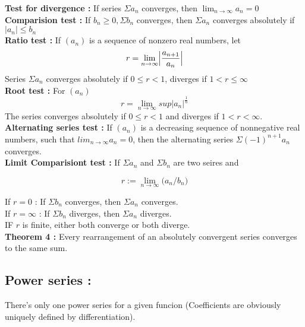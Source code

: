 \documentclass{report}
\begin{document}
\noindent \textbf{Test for divergence :}  If series $\Sigma a_n$ converges, then $\lim_{n\to\infty} a_n = 0$ \\

\noindent \textbf{Comparision test :} If $b_n\ge0, \Sigma b_n$ converges, then $\Sigma a_n$ converges absolutely if $|a_n| \le b_n$\\

\noindent \textbf{Ratio test :} If $(a_n)$ is a sequence of nonzero real numbers, let 
$$ r = \lim_{n\to\infty}\Bigl|\frac{a_{n+1}}{a_n}\Bigr|$$
\noindent Series $\Sigma a_n$ converges absolutely if $0\le r<1$, diverges if $1<r\le \infty$\\

\noindent \textbf{Root test :} For $(a_n)$
$$ r = \lim_{n\to\infty} sup|a_n|^{\frac{1}{n}}$$
\noindent The series converges absolutely if $0\le r<1$ and diverges if $1<r<\infty$.\\

\noindent\textbf{Alternating series test :} If $(a_n)$ is a decreasing sequence of nonnegative real numbers, such that $lim_{n\to\infty}a_n=0$, then the alternating series $\Sigma (-1)^{n+1}a_n$ converges.\\

\noindent\textbf{Limit Comparisiont test :} If $\Sigma a_n$ and $\Sigma b_n$ are two seires and 

$$ r:= \lim_{n\to\infty}\big(a_n/b_n\big) $$

\noindent If $r=0$ : If $\Sigma b_n$ converges, then $\Sigma a_n$ converges.\\
\noindent If $r=\infty$ : If $\Sigma b_n$ diverges, then $\Sigma a_n$ diverges.\\
\noindent IF $r$ is finite, either both converge or both diverge.\\

\noindent\textbf{Theorem 4 :} Every rearrangement of an absolutely convergent series converges to the same sum.\\

\subsection{Power series :}

There's only one power series for a given funcion (Coefficients are obviously uniquely defined by differentiation).
\end{document}
